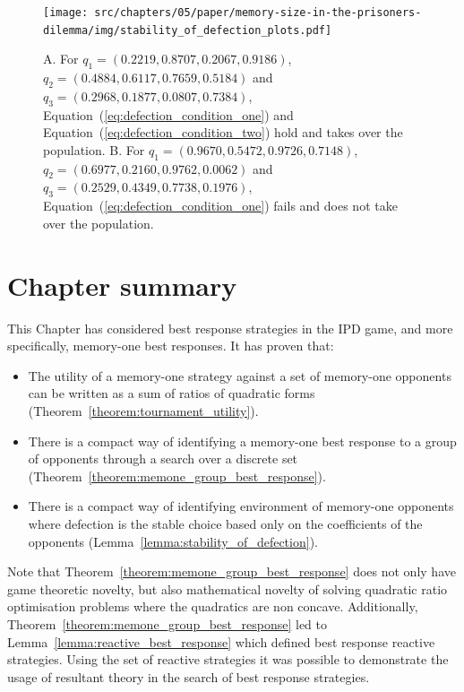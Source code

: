 \begin{figure}[!htbp]
    \centering
    \texttt{[image: src/chapters/05/paper/memory-size-in-the-prisoners-dilemma/img/stability\_of\_defection\_plots.pdf]}
    \caption{A. For \(q_{1}=(0.2219, 0.8707, 0.2067, 0.9186)\),
    $q_{2}=(0.4884, 0.6117, 0.7659, 0.5184)$ and
    $q_{3}=(0.2968, 0.1877, 0.0807, 0.7384)$, Equation~(\ref{eq:defection_condition_one}) and
    Equation~(\ref{eq:defection_condition_two}) hold and \Defector takes over the
    population. \protect\linebreak
    B. For $q_{1}=(0.9670, 0.5472, 0.9726, 0.7148)$,
    $q_{2}=(0.6977, 0.2160, 0.9762, 0.0062)$ and
    $q_{3}=(0.2529, 0.4349, 0.7738, 0.1976)$, Equation~(\ref{eq:defection_condition_one}) fails
    and \Defector does not take over the population.}\label{fig:stability_of_defection}
\end{figure}

\section{Chapter summary}

This Chapter has considered best response strategies in the IPD
game, and more specifically, memory-one best responses. It has proven that:

\begin{itemize}
    \item The utility of a memory-one strategy against a set
          of memory-one opponents can be written as a sum of ratios of quadratic
          forms (Theorem~\ref{theorem:tournament_utility}).
    \item There is a compact way of identifying a memory-one best response to a
        group of opponents through a search over a discrete set
        (Theorem~\ref{theorem:memone_group_best_response}).
    \item There is a compact way of identifying environment of memory-one
    opponents where defection is the stable choice based only on the
    coefficients of the opponents (Lemma~\ref{lemma:stability_of_defection}).
\end{itemize}

Note that Theorem~\ref{theorem:memone_group_best_response} does not only
have game theoretic novelty, but also mathematical novelty of solving quadratic
ratio optimisation problems where the quadratics are non concave. Additionally,
Theorem~\ref{theorem:memone_group_best_response} led to
Lemma~\ref{lemma:reactive_best_response} which defined best response reactive
strategies. Using the set of reactive strategies it was possible to demonstrate
the usage of resultant theory in the search of best response strategies.

